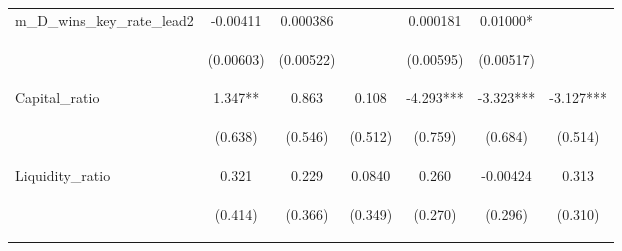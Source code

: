 \documentclass[]{article}
\begin{document}
\begin{center}
\begin{tabular}{lcccccc}
m\_D\_wins\_key\_rate\_lead2 & -0.00411 & 0.000386 &  & 0.000181 & 0.01000* &  \\
\vspace{4pt} & \begin{footnotesize}(0.00603)\end{footnotesize} & \begin{footnotesize}(0.00522)\end{footnotesize} & \begin{footnotesize}\end{footnotesize} & \begin{footnotesize}(0.00595)\end{footnotesize} & \begin{footnotesize}(0.00517)\end{footnotesize} & \begin{footnotesize}\end{footnotesize} \\
Capital\_ratio & 1.347** & 0.863 & 0.108 & -4.293*** & -3.323*** & -3.127*** \\
\vspace{4pt} & \begin{footnotesize}(0.638)\end{footnotesize} & \begin{footnotesize}(0.546)\end{footnotesize} & \begin{footnotesize}(0.512)\end{footnotesize} & \begin{footnotesize}(0.759)\end{footnotesize} & \begin{footnotesize}(0.684)\end{footnotesize} & \begin{footnotesize}(0.514)\end{footnotesize} \\
Liquidity\_ratio & 0.321 & 0.229 & 0.0840 & 0.260 & -0.00424 & 0.313 \\
\vspace{4pt} & \begin{footnotesize}(0.414)\end{footnotesize} & \begin{footnotesize}(0.366)\end{footnotesize} & \begin{footnotesize}(0.349)\end{footnotesize} & \begin{footnotesize}(0.270)\end{footnotesize} & \begin{footnotesize}(0.296)\end{footnotesize} & \begin{footnotesize}(0.310)\end{footnotesize} \\

\end{tabular}
\end{center}
\end{document}
